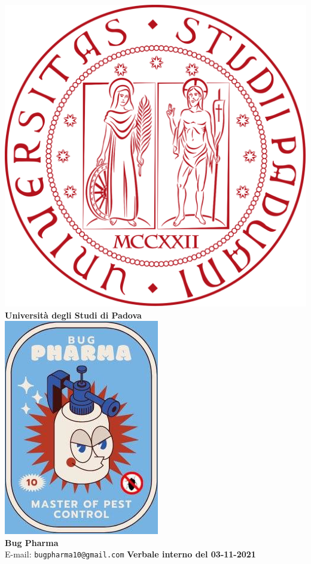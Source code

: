 \documentclass[11pt]{article}
\begin{document}
	\thispagestyle{empty}
	\begin{titlepage}
		\begin{center}
			\includegraphics[scale = 0.05]{logo_unipd.png}\\
			\large \textbf{Università degli Studi di Padova} \\
			\vfill
			\includegraphics[scale = 0.7]{logo_small.jpg}\\
			\large \textbf{Bug Pharma} \\
			\vfill
			\large
			E-mail: 
			\texttt{bugpharma10@gmail.com}
			\vfill
			\Huge \textbf{Verbale interno del 03-11-2021}\\
			

\end{center}
\end{titlepage}
\end{document}
